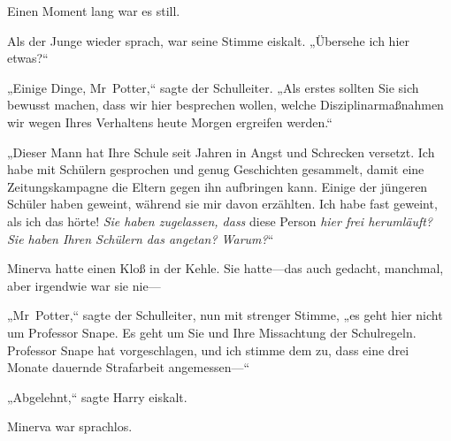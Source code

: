 Einen Moment lang war es still.

Als der Junge wieder sprach, war seine Stimme eiskalt. „Übersehe ich hier etwas?“

„Einige Dinge, Mr~Potter,“ sagte der Schulleiter. „Als erstes sollten Sie sich bewusst machen, dass wir hier besprechen wollen, welche Disziplinarmaßnahmen wir wegen Ihres Verhaltens heute Morgen ergreifen werden.“

„Dieser Mann hat Ihre Schule seit Jahren in Angst und Schrecken versetzt. Ich habe mit Schülern gesprochen und genug Geschichten gesammelt, damit eine Zeitungskampagne die Eltern gegen ihn aufbringen kann. Einige der jüngeren Schüler haben geweint, während sie mir davon erzählten. Ich habe fast geweint, als ich das hörte! \emph{Sie haben zugelassen, dass} diese Person \emph{hier frei herumläuft? Sie haben Ihren Schülern das angetan? Warum?}“

Minerva hatte einen Kloß in der Kehle. Sie hatte—das auch gedacht, manchmal, aber irgendwie war sie nie—

„Mr~Potter,“ sagte der Schulleiter, nun mit strenger Stimme, „es geht hier nicht um Professor Snape. Es geht um Sie und Ihre Missachtung der Schulregeln. Professor Snape hat vorgeschlagen, und ich stimme dem zu, dass eine drei Monate dauernde Strafarbeit angemessen—“

„Abgelehnt,“ sagte Harry eiskalt.

Minerva war sprachlos.

